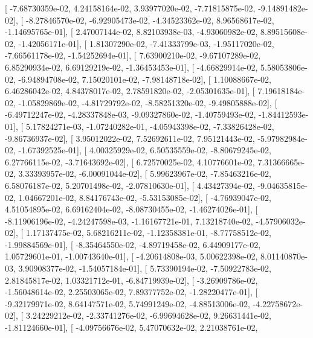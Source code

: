 \documentclass{article}
\begin{document}
       [ -7.68730359e-02,   4.24158164e-02,   3.93977020e-02,
         -7.71815875e-02,  -9.14891482e-02],
       [ -8.27846570e-02,  -6.92905473e-02,  -4.34523362e-02,
          8.96568617e-02,  -1.14695765e-01],
       [  2.47007144e-02,   8.82103938e-03,  -4.93060982e-02,
          8.89515608e-02,  -1.42056171e-01],
       [  1.81307290e-02,  -7.41333799e-03,  -1.95117020e-02,
         -7.66561178e-02,  -1.54252694e-01],
       [  7.63900210e-02,  -9.67107289e-02,   6.85290934e-02,
          6.69129219e-02,  -1.36453453e-01],
       [ -4.66829914e-02,   5.58053806e-02,  -6.94894708e-02,
          7.15020101e-02,  -7.98148718e-02],
       [  1.10088667e-02,   6.46286042e-02,   4.84378017e-02,
          2.78591820e-02,  -2.05301635e-01],
       [  7.19618184e-02,  -1.05829869e-02,  -4.81729792e-02,
         -8.58251320e-02,  -9.49805888e-02],
       [ -6.49712247e-02,  -4.28337848e-03,  -9.09327860e-02,
         -1.40759493e-02,  -1.84412593e-01],
       [  5.17824271e-03,  -1.07240282e-01,  -4.05943398e-02,
         -7.33826428e-02,  -9.86736937e-02],
       [  3.95012022e-02,   7.52692611e-02,   7.95121443e-02,
         -5.97982984e-02,  -1.67392525e-01],
       [  4.00325929e-02,   6.50535559e-02,  -8.80679245e-02,
          6.27766115e-02,  -3.71643692e-02],
       [  6.72570025e-02,   4.10776601e-02,   7.31366665e-02,
          3.33393957e-02,  -6.00091044e-02],
       [  5.99623967e-02,  -7.85463216e-02,   6.58076187e-02,
          5.20701498e-02,  -2.07810630e-01],
       [  4.43427394e-02,  -9.04635815e-02,   1.04667201e-02,
          8.84176743e-02,  -5.53153085e-02],
       [ -4.76939047e-02,   4.51054895e-02,   6.69162404e-02,
         -8.08730455e-02,  -1.46274026e-01],
       [ -8.11906196e-02,  -4.24247598e-03,  -1.16167721e-01,
          7.13218740e-02,  -4.57906032e-02],
       [  1.17137475e-02,   5.68216211e-02,  -1.12358381e-01,
         -8.77758512e-02,  -1.99884569e-01],
       [ -8.35464550e-02,  -4.89719458e-02,   6.44909177e-02,
          1.05729601e-01,  -1.00743640e-01],
       [ -4.20614808e-03,   5.00622398e-02,   8.01140870e-03,
          3.90908377e-02,  -1.54057184e-01],
       [  5.73390194e-02,  -7.50922783e-02,   2.81845817e-02,
          1.03321712e-01,  -6.84719939e-02],
       [ -3.26909786e-02,  -1.56048614e-02,   2.25503065e-02,
          7.89377752e-02,  -1.28220477e-01],
       [ -9.32179971e-02,   8.64147571e-02,   5.74991249e-02,
         -4.88513006e-02,  -4.22758672e-02],
       [  3.24229212e-02,  -2.33741276e-02,  -6.99694628e-02,
          9.26631441e-02,  -1.81124660e-01],
       [ -4.09756676e-02,   5.47070632e-02,   2.21038761e-02,
\end{document}
